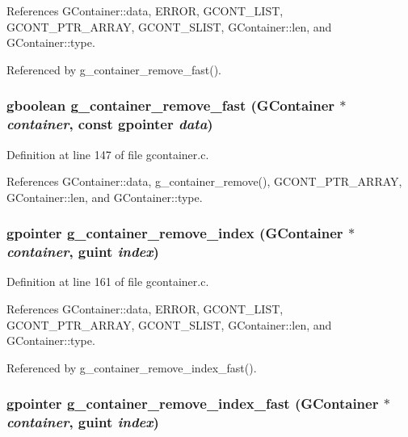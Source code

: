 References GContainer::data, ERROR, GCONT\_\-LIST, GCONT\_\-PTR\_\-ARRAY, GCONT\_\-SLIST, GContainer::len, and GContainer::type.

Referenced by g\_\-container\_\-remove\_\-fast().
\subsubsection{\setlength{\rightskip}{0pt plus 5cm}gboolean g\_\-container\_\-remove\_\-fast ({\bf GContainer} $\ast$ {\em container}, const gpointer {\em data})}\label{gcontainer_8c_a8}




Definition at line 147 of file gcontainer.c.

References GContainer::data, g\_\-container\_\-remove(), GCONT\_\-PTR\_\-ARRAY, GContainer::len, and GContainer::type.
\subsubsection{\setlength{\rightskip}{0pt plus 5cm}gpointer g\_\-container\_\-remove\_\-index ({\bf GContainer} $\ast$ {\em container}, guint {\em index})}\label{gcontainer_8c_a9}




Definition at line 161 of file gcontainer.c.

References GContainer::data, ERROR, GCONT\_\-LIST, GCONT\_\-PTR\_\-ARRAY, GCONT\_\-SLIST, GContainer::len, and GContainer::type.

Referenced by g\_\-container\_\-remove\_\-index\_\-fast().
\subsubsection{\setlength{\rightskip}{0pt plus 5cm}gpointer g\_\-container\_\-remove\_\-index\_\-fast ({\bf GContainer} $\ast$ {\em container}, guint {\em index})}\label{gcontainer_8c_a10}




